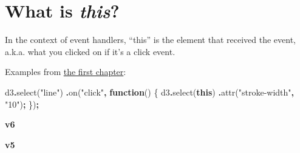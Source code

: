 \documentclass[
  openany]{book}
\newenvironment{Shaded}{\begin{snugshade}}{\end{snugshade}}
\newcommand{\BuiltInTok}[1]{#1}
\newcommand{\FunctionTok}[1]{\textcolor[rgb]{0.00,0.00,0.00}{#1}}
\newcommand{\KeywordTok}[1]{\textcolor[rgb]{0.13,0.29,0.53}{\textbf{#1}}}
\newcommand{\NormalTok}[1]{#1}
\newcommand{\OperatorTok}[1]{\textcolor[rgb]{0.81,0.36,0.00}{\textbf{#1}}}
\newcommand{\SpecialCharTok}[1]{\textcolor[rgb]{0.00,0.00,0.00}{#1}}
\newcommand{\StringTok}[1]{\textcolor[rgb]{0.31,0.60,0.02}{#1}}
\newcommand{\VerbatimStringTok}[1]{\textcolor[rgb]{0.31,0.60,0.02}{#1}}
\begin{document}
\hypertarget{what-is-this}{%
\section{\texorpdfstring{What is \emph{this}?}{What is this?}}\label{what-is-this}}

In the context of event handlers, ``this'' is the element that received the event, a.k.a. what you clicked on if it's a click event.

Examples from \href{jump.html\#interactivity}{the first chapter}:

\begin{Shaded}
\begin{Highlighting}[]
\NormalTok{d3}\OperatorTok{.}\FunctionTok{select}\NormalTok{(}\StringTok{"line"}\NormalTok{)}
  \OperatorTok{.}\FunctionTok{on}\NormalTok{(}\StringTok{"click"}\OperatorTok{,} \KeywordTok{function}\NormalTok{() \{}
\NormalTok{    d3}\OperatorTok{.}\FunctionTok{select}\NormalTok{(}\KeywordTok{this}\NormalTok{)}
      \OperatorTok{.}\FunctionTok{attr}\NormalTok{(}\StringTok{"stroke{-}width"}\OperatorTok{,} \StringTok{"10"}\NormalTok{)}\OperatorTok{;}
\NormalTok{      \})}\OperatorTok{;}
\end{Highlighting}
\end{Shaded}

\textbf{v6}

\begin{Shaded}
\end{Shaded}

\textbf{v5}
\end{document}
